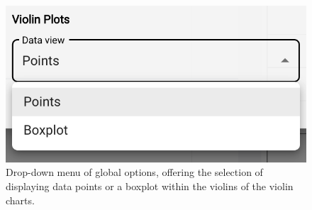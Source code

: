\begin{figure}[h]
  \centering
  \includegraphics[width=0.4\linewidth]{figures/chart-configuration-violin.png}
  \caption{Drop-down menu of global options, offering the selection of displaying data points or a boxplot within the violins of the violin charts.}
  \label{fig:chart-configuration-violin}
\end{figure}
